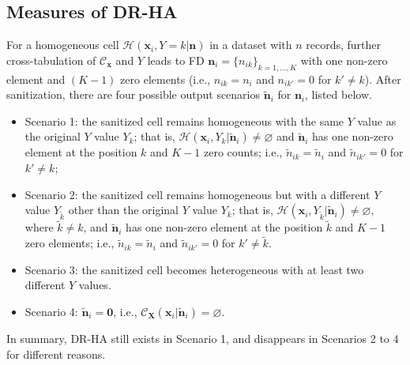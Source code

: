 \documentclass[10pt,journal,compsoc]{IEEEtran}
\newcommand{\n}{\mathbf{n}}
\newcommand{\X}{\mathbf{X}}
\newcommand{\x}{\mathbf{x}}
\newcommand{\C}{\mathcal{C}}
\begin{document}
\vspace{-9pt}\subsection{Measures of DR-HA}\label{sec:DRHA}\vspace{-5pt}
For a homogeneous cell  $\mathcal{H}(\x_i,Y=k|\n)$ in a dataset with $n$ records, further cross-tabulation of $\mathscr{C}_{\x}$ and $Y$ leads to FD $\n_i\!=\!\{n_{ik}\}_{k=1,\ldots,K}$ with  one non-zero  element and $(K-1)$ zero elements (i.e., $n_{ik}\!=\!n_i$ and $n_{ik'}\!=\!0$ for $k'\ne k$). After sanitization, there are four possible output scenarios $\tilde{\n}_i$ for $\n_i$, listed below. \vspace{-3pt}
\begin{itemize}[leftmargin=15pt]\setlength\itemsep{-3pt} 
\item Scenario 1: the sanitized cell remains  homogeneous with the same $Y$ value as the original $Y$ value $Y_k$; that is, $\mathcal{H}(\x_i,Y_k|\tilde{\n}_i)\ne\varnothing$ and $\tilde{\n}_i$ has one non-zero  element at the position $k$ and $K-1$ zero counts; i.e., $\tilde{n}_{ik}=\tilde{n}_{i}$ and $\tilde{n}_{ik'}=0$ for $k'\ne k$;
\item Scenario 2: the sanitized cell remains homogeneous but with a different  $Y$ value $Y_{\tilde{k}}$ other than the original $Y$ value $Y_k$; that is, $\mathcal{H}(\x_i,Y_{\tilde{k}}|\tilde{\n}_i)\ne\varnothing$, where $\tilde{k}\ne k$, and $\tilde{\n}_i$ has one non-zero  element at the position $\tilde{k}$ and $K-1$ zero elements; i.e., $\tilde{n}_{ik}=\tilde{n}_i$ and $\tilde{n}_{ik'}=0$ for $k'\ne \tilde{k}$. 
\item Scenario 3:$\!$ the sanitized cell becomes heterogeneous with at least two different $Y\!$ values. 
\item Scenario 4: $\tilde{\n}_i=\mathbf{0}$, i.e., $\C_{\X}(\x_i|\tilde{\n}_i)=\varnothing$.
\end{itemize} 
In summary, DR-HA still exists in Scenario 1, and disappears in Scenarios 2 to 4 for different reasons.
\end{document}
